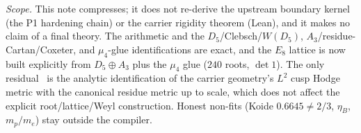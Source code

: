 \noindent\emph{Scope.} This note compresses; it does not re-derive the upstream boundary kernel
(the P1 hardening chain) or the carrier rigidity theorem (Lean), and it makes no claim of a final theory. The
arithmetic and the $D_5$/Clebsch/$W(D_5)$, $A_3$/residue-Cartan/Coxeter, and $\mu_4$-glue
identifications are exact, and the $E_8$ lattice is now built explicitly from $D_5\oplus A_3$ plus the
$\mu_4$ glue ($240$ roots, $\det1$). The only residual \mC\ is the analytic identification of the carrier geometry's
$L^2$ cusp Hodge metric with the canonical residue metric up to scale, which does not affect the
explicit root/lattice/Weyl construction. Honest non-fits (Koide $0.6645\neq2/3$, $\eta_B$, $m_p/m_e$)
stay outside the compiler.

